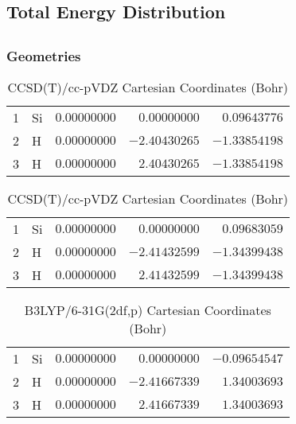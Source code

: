 \documentclass[10pt,oneside]{article}
\begin{document}
\begin{table}
\subsection*{Total Energy Distribution}
\centering\end{table}

\clearpage

\subsection{}

\begin{table}[h!]
\subsubsection*{Geometries}
\begin{multicols}{2}
\centering
\caption{CCSD(T)/cc-pVTZ Cartesian Coordinates (Bohr)}
\begin{tabular}{llrrr}
\toprule
1  & Si & $ 0.00000000$ & $ 0.00000000$ & $ 0.09643776$ \\
2  & H  & $ 0.00000000$ & $-2.40430265$ & $-1.33854198$ \\
3  & H  & $ 0.00000000$ & $ 2.40430265$ & $-1.33854198$ \\
\bottomrule
\end{tabular}
\caption{CCSD(T)/cc-pVDZ Cartesian Coordinates (Bohr)}
\begin{tabular}{llrrr}
\toprule
1  & Si & $ 0.00000000$ & $ 0.00000000$ & $ 0.09683059$ \\
2  & H  & $ 0.00000000$ & $-2.41432599$ & $-1.34399438$ \\
3  & H  & $ 0.00000000$ & $ 2.41432599$ & $-1.34399438$ \\
\bottomrule
\end{tabular}
\end{multicols}
\end{table}

\begin{table}[h]
\centering
\caption{B3LYP/6-31G(2df,p) Cartesian Coordinates (Bohr)}
\begin{tabular}{llrrr}
\toprule
1  & Si & $ 0.00000000$ & $ 0.00000000$ & $-0.09654547$ \\
2  & H  & $ 0.00000000$ & $-2.41667339$ & $ 1.34003693$ \\
3  & H  & $ 0.00000000$ & $ 2.41667339$ & $ 1.34003693$ \\
\bottomrule
\end{tabular}
\end{table}
\end{document}
